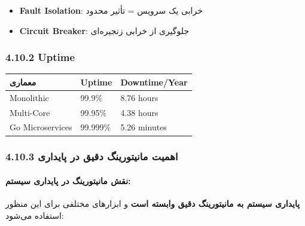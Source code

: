 \documentclass[
]{article}
\newcounter{none} %
\providecommand{\tightlist}{%
  \setlength{\itemsep}{0pt}\setlength{\parskip}{0pt}}
\begin{document}
\begin{itemize}
\tightlist
\item
  \textbf{Fault Isolation}: خرابی یک سرویس = تأثیر محدود
\item
  \textbf{Circuit Breaker}: جلوگیری از خرابی زنجیره‌ای
\end{itemize}

\subsubsection{4.10.2 Uptime}\label{uptime}

{\def\LTcaptype{none} %
\begin{longtable}[]{@{}lll@{}}
\toprule\noalign{}
معماری & Uptime & Downtime/Year \\
\midrule\noalign{}
\endhead
\bottomrule\noalign{}
\endlastfoot
Monolithic & 99.9\% & 8.76 hours \\
Multi-Core & 99.95\% & 4.38 hours \\
Go Microservices & 99.999\% & 5.26 minutes \\
\end{longtable}
}

\subsubsection{4.10.3 اهمیت مانیتورینگ دقیق در
پایداری}\label{ux627ux647ux645ux6ccux62a-ux645ux627ux646ux6ccux62aux648ux631ux6ccux646ux6af-ux62fux642ux6ccux642-ux62fux631-ux67eux627ux6ccux62fux627ux631ux6cc}

\paragraph{نقش مانیتورینگ در پایداری
سیستم:}\label{ux646ux642ux634-ux645ux627ux646ux6ccux62aux648ux631ux6ccux646ux6af-ux62fux631-ux67eux627ux6ccux62fux627ux631ux6cc-ux633ux6ccux633ux62aux645}

\textbf{پایداری سیستم به مانیتورینگ دقیق وابسته است} و ابزارهای مختلفی
برای این منظور استفاده می‌شود:
\end{document}
